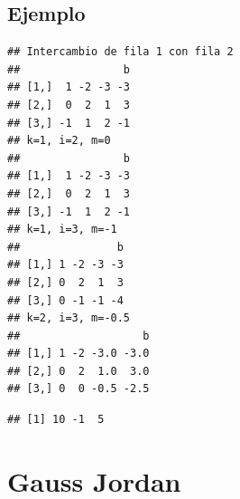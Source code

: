 \documentclass[
]{book}
\newenvironment{Shaded}{\begin{snugshade}}{\end{snugshade}}
\newcommand{\AttributeTok}[1]{\textcolor[rgb]{0.13,0.29,0.53}{#1}}
\newcommand{\ConstantTok}[1]{\textcolor[rgb]{0.56,0.35,0.01}{#1}}
\newcommand{\DecValTok}[1]{\textcolor[rgb]{0.00,0.00,0.81}{#1}}
\newcommand{\FloatTok}[1]{\textcolor[rgb]{0.00,0.00,0.81}{#1}}
\newcommand{\FunctionTok}[1]{\textcolor[rgb]{0.13,0.29,0.53}{\textbf{#1}}}
\newcommand{\NormalTok}[1]{#1}
\newcommand{\OtherTok}[1]{\textcolor[rgb]{0.56,0.35,0.01}{#1}}
\newcommand{\SpecialCharTok}[1]{\textcolor[rgb]{0.81,0.36,0.00}{\textbf{#1}}}
\begin{document}
\subsection{Ejemplo}\label{ejemplo-1}

\begin{Shaded}
\end{Shaded}

\begin{verbatim}
## Intercambio de fila 1 con fila 2
##                b
## [1,]  1 -2 -3 -3
## [2,]  0  2  1  3
## [3,] -1  1  2 -1
## k=1, i=2, m=0
##                b
## [1,]  1 -2 -3 -3
## [2,]  0  2  1  3
## [3,] -1  1  2 -1
## k=1, i=3, m=-1
##               b
## [1,] 1 -2 -3 -3
## [2,] 0  2  1  3
## [3,] 0 -1 -1 -4
## k=2, i=3, m=-0.5
##                   b
## [1,] 1 -2 -3.0 -3.0
## [2,] 0  2  1.0  3.0
## [3,] 0  0 -0.5 -2.5
\end{verbatim}

\begin{verbatim}
## [1] 10 -1  5
\end{verbatim}

\section{Gauss Jordan}\label{gauss-jordan}
\end{document}

